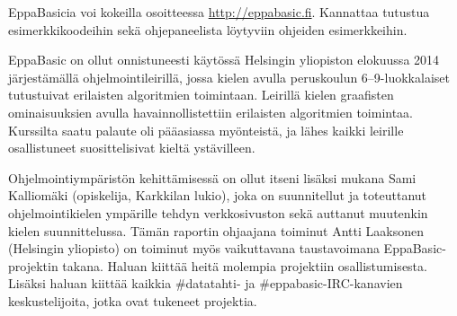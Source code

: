 EppaBasicia voi kokeilla osoitteessa
\url{http://eppabasic.fi}.
Kannattaa tutustua esimerkkikoodeihin
sekä ohjepaneelista löytyviin
ohjeiden esimerkkeihin.

EppaBasic on ollut onnistuneesti käytössä
Helsingin yliopiston elokuussa 2014
järjestämällä ohjelmointileirillä,
jossa kielen avulla peruskoulun
6--9-luokkalaiset
tutustuivat erilaisten algoritmien toimintaan.
Leirillä kielen graafisten ominaisuuksien
avulla havainnollistettiin erilaisten
algoritmien toimintaa.
Kurssilta saatu palaute oli pääasiassa myönteistä,
ja lähes kaikki leirille osallistuneet
suosittelisivat kieltä ystävilleen.

Ohjelmointiympäristön kehittämisessä on
ollut itseni lisäksi mukana
Sami Kalliomäki (opiskelija, Karkkilan lukio),
joka on suunnitellut ja toteuttanut
ohjelmointikielen ympärille tehdyn verkkosivuston
sekä auttanut muutenkin kielen suunnittelussa.
Tämän raportin ohjaajana toiminut
Antti Laaksonen (Helsingin yliopisto)
on toiminut myös vaikuttavana
taustavoimana EppaBasic-projektin takana.
Haluan kiittää heitä molempia
projektiin osallistumisesta.
Lisäksi haluan kiittää kaikkia
\#datatahti- ja
\#eppabasic-IRC-kanavien keskustelijoita,
jotka ovat tukeneet projektia.